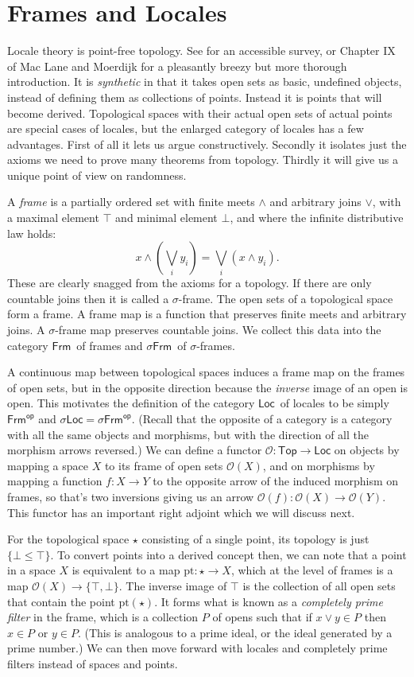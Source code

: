 \documentclass[14pt]{extarticle}
\newcommand{\op}[1]{#1^{\textsf{op}}}
\newcommand{\bottom}{\ensuremath{\bot}}
\newcommand{\Frm}{\ensuremath{\mathsf{Frm}}}
\newcommand{\sFrm}{\ensuremath{\mathsf{\sigma Frm}}}
\newcommand{\Locale}{\ensuremath{\mathsf{Loc}}}
\newcommand{\Topcat}{\ensuremath{\mathsf{Top}}}
\newcommand{\slocale}{\ensuremath{\mathsf{\sigma Loc}}}
\renewcommand{\o}{\ensuremath{\mathcal{O}}}
\begin{document}
\section{Frames and Locales}

Locale theory is point-free topology. See \cite{johnstone1983} for an accessible survey, or Chapter IX of Mac Lane and Moerdijk \cite{maclane} for a pleasantly breezy but more thorough introduction. It is \emph{synthetic} in that it takes open sets as basic, undefined objects, instead of defining them as collections of points. Instead it is points that will become derived. Topological spaces with their actual open sets of actual points are special cases of locales, but the enlarged category of locales has a few advantages. First of all it lets us argue constructively. Secondly it isolates just the axioms we need to prove many theorems from topology. Thirdly it will give us a unique point of view on randomness.

A \emph{frame} is a partially ordered set with finite meets $\wedge$ and arbitrary joins $\vee$, with a maximal element $\top$ and minimal element $\bottom$, and where the infinite distributive law holds: $$x \wedge (\bigvee_i y_i)=\bigvee_i (x\wedge y_i).$$ These are clearly snagged from the axioms for a topology. If there are only countable joins then it is called a $\sigma$-frame. The open sets of a topological space form a frame. A frame map is a function that preserves finite meets and arbitrary joins. A $\sigma$-frame map preserves countable joins. We collect this data into the category \Frm\ of frames and \sFrm\ of $\sigma$-frames.

A continuous map between topological spaces induces a frame map on the frames of open sets, but in the opposite direction because the \emph{inverse} image of an open is open. This motivates the definition of the category \Locale\ of locales to be simply $\op{\Frm}$ and $\slocale=\op{\sFrm}$. (Recall that the opposite of a category is a category with all the same objects and morphisms, but with the direction of all the morphism arrows reversed.) We can define a functor $\o:\Topcat\to\Locale$ on objects by mapping a space $X$ to its frame of open sets $\o(X)$, and on morphisms by mapping a function $f:X\to Y$ to the opposite arrow of the induced morphism on frames, so that's two inversions giving us an arrow $\o(f):\o(X)\to \o(Y)$. This functor has an important right adjoint which we will discuss next.

For the topological space $\star$ consisting of a single point, its topology is just $\{\bot \leq \top\}$. To convert points into a derived concept then, we can note that a point in a space $X$ is equivalent to a map $\mathrm{pt}:\star\to X$, which at the level of frames is a map $\o(X)\to\{\top, \bot\}$. The inverse image of $\top$ is the collection of all open sets that contain the point $\mathrm{pt}(\star)$. It forms what is known as a \emph{completely prime filter} in the frame, which is a collection $P$ of opens such that if $x\vee y\in P$ then $x\in P$ or $y\in P$. (This is analogous to a prime ideal, or the ideal generated by a prime number.) We can then move forward with locales and completely prime filters instead of spaces and points. 
\end{document}
